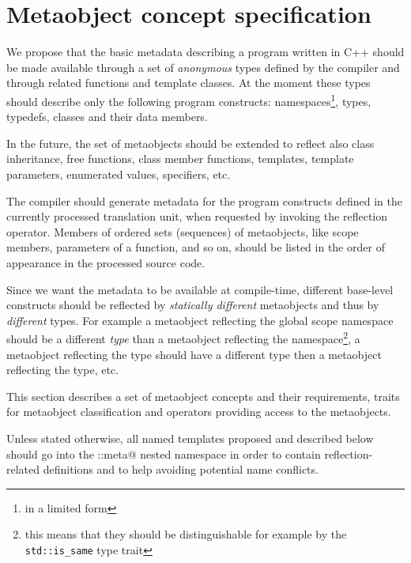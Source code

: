 \section{Metaobject concept specification}
\label{section-current-Concepts}

We propose that the basic metadata describing a program written
in C++ should be made available through a set of {\em anonymous} types
defined by the compiler and through related functions and template classes.
At the moment these types should describe only the following program
constructs: namespaces\footnote{in a limited form}, types, typedefs,
classes and their data members.

In the future, the set of metaobjects should be extended to reflect also
class inheritance, free functions, class member functions, templates,
template parameters, enumerated values, specifiers, etc.

The compiler should generate metadata for the program constructs defined
in the currently processed translation unit, when requested by invoking
the reflection operator. Members of ordered sets (sequences) of metaobjects,
like scope members, parameters of a function, and so on, should be listed
in the order of appearance in the processed source code.

Since we want the metadata to be available at compile-time,
different base-level constructs should be reflected by
{\em statically different} metaobjects and thus by {\em different} types.
For example a metaobject reflecting the global scope namespace should
be a different {\em type} than a metaobject reflecting the \verb@std@
namespace\footnote{this means that they should be distinguishable for
example by the \texttt{std::is\_same} type trait},
a metaobject reflecting the \verb@int@ type should
have a different type then a metaobject reflecting the \verb@double@
type, etc.

This section describes a set of metaobject concepts and their requirements,
traits for metaobject classification and operators providing access to the metaobjects.

Unless stated otherwise, all named templates proposed and described below should
go into the \verb@std::meta@ nested namespace in order to contain reflection-related
definitions and to help avoiding potential name conflicts.

























